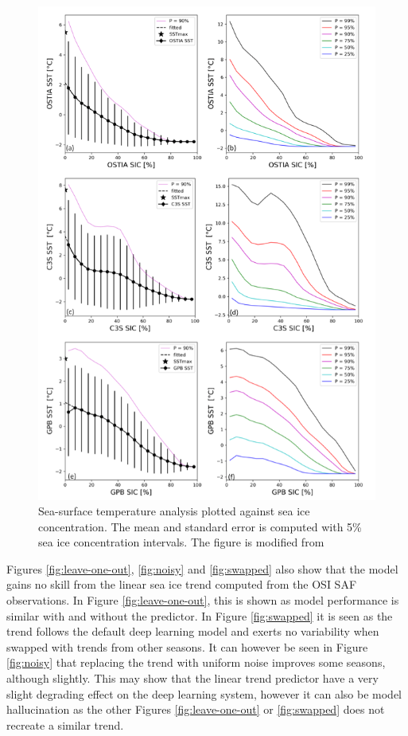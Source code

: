 \documentclass[../main/thesis]{subfiles}
\begin{document}
\begin{figure}
    \centering
    \includegraphics[trim={0 20cm 10.7cm 0}, clip]{EastwoodSST}
    \caption{\label{fig:sst-uncertain}Sea-surface temperature analysis plotted against sea ice concentration. The mean and standard error is computed with 5\% sea ice concentration intervals. The figure is modified from \protect\citet{Castro2023}}
\end{figure}

Figures \ref{fig:leave-one-out}, \ref{fig:noisy} and \ref{fig:swapped} also show that the model gains no skill from the linear sea ice trend computed from the OSI SAF observations. In Figure \ref{fig:leave-one-out}, this is shown as model performance is similar with and without the predictor. In Figure \ref{fig:swapped} it is seen as the trend follows the default deep learning model and exerts no variability when swapped with trends from other seasons. It can however be seen in Figure \ref{fig:noisy} that replacing the trend with uniform noise improves some seasons, although slightly. This may show that the linear trend predictor have a very slight degrading effect on the deep learning system, however it can also be model hallucination as the other Figures \ref{fig:leave-one-out} or \ref{fig:swapped} does not recreate a similar trend.
\end{document}
